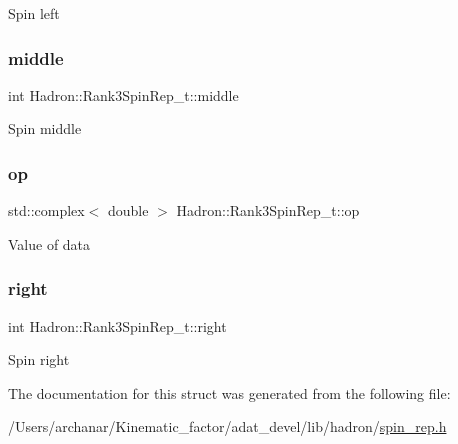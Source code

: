 Spin left \mbox{\label{structHadron_1_1Rank3SpinRep__t_a5901db603fb0f90ff5d21e2a2200f113}} 
\subsubsection{\texorpdfstring{middle}{middle}}
{\footnotesize\ttfamily int Hadron\+::\+Rank3\+Spin\+Rep\+\_\+t\+::middle}

Spin middle \mbox{\label{structHadron_1_1Rank3SpinRep__t_aef54e280db29fb78a40da50a1009c4d7}} 
\subsubsection{\texorpdfstring{op}{op}}
{\footnotesize\ttfamily std\+::complex$<$ double $>$ Hadron\+::\+Rank3\+Spin\+Rep\+\_\+t\+::op}

Value of data \mbox{\label{structHadron_1_1Rank3SpinRep__t_a4c75ba1e0c96a5d679368619cbcbbcf0}} 
\subsubsection{\texorpdfstring{right}{right}}
{\footnotesize\ttfamily int Hadron\+::\+Rank3\+Spin\+Rep\+\_\+t\+::right}

Spin right 

The documentation for this struct was generated from the following file\+:\begin{DoxyCompactItemize}
\item 
/\+Users/archanar/\+Kinematic\+\_\+factor/adat\+\_\+devel/lib/hadron/\mbox{\hyperlink{lib_2hadron_2spin__rep_8h}{spin\+\_\+rep.\+h}}\end{DoxyCompactItemize}
